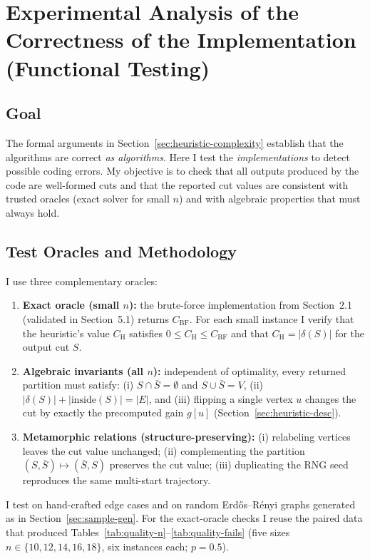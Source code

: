 \documentclass[12pt]{article}
\begin{document}
\section{Experimental Analysis of the Correctness of the Implementation (Functional Testing)}
\label{sec:functional}

\subsection{Goal}
The formal arguments in Section~\ref{sec:heuristic-complexity} establish that the algorithms are correct \emph{as algorithms}. Here I test the \emph{implementations} to detect possible coding errors. My objective is to check that all outputs produced by the code are well-formed cuts and that the reported cut values are consistent with trusted oracles (exact solver for small $n$) and with algebraic properties that must always hold.

\subsection{Test Oracles and Methodology}
I use three complementary oracles:
\begin{enumerate}
    \item \textbf{Exact oracle (small $n$):} the brute-force implementation from Section~2.1 (validated in Section~5.1) returns $C_{\mathrm{BF}}$. For each small instance I verify that the heuristic’s value $C_{\mathrm{H}}$ satisfies $0\le C_{\mathrm{H}}\le C_{\mathrm{BF}}$ and that $C_{\mathrm{H}}=|\delta(S)|$ for the output cut $S$.
    \item \textbf{Algebraic invariants (all $n$):} independent of optimality, every returned partition must satisfy: (i) $S\cap \bar S=\emptyset$ and $S\cup\bar S=V$, (ii) $|\delta(S)|+|\text{inside}(S)|=|E|$, and (iii) flipping a single vertex $u$ changes the cut by exactly the precomputed gain $g[u]$ (Section~\ref{sec:heuristic-desc}).
    \item \textbf{Metamorphic relations (structure-preserving):} (i) relabeling vertices leaves the cut value unchanged; (ii) complementing the partition $(S,\bar S)\mapsto(\bar S,S)$ preserves the cut value; (iii) duplicating the RNG seed reproduces the same multi-start trajectory.
\end{enumerate}
I test on hand-crafted edge cases and on random Erd\H{o}s--R\'enyi graphs generated as in Section~\ref{sec:sample-gen}. For the exact-oracle checks I reuse the paired data that produced Tables~\ref{tab:quality-n}--\ref{tab:quality-fails} (five sizes $n\in\{10,12,14,16,18\}$, six instances each; $p=0.5$).
\end{document}
